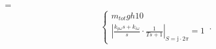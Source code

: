 =\begin{equation}
    \begin{cases}
      m_{tot} g h  10\\
      \left\lvert\frac{k_{p\omega}s+k_{i\omega}}{s}\cdot\frac{1}{Ts+1}\right\rvert_{S=\mathrm{j}\cdot2\pi}=1
    \end{cases}\,.
\end{equation}